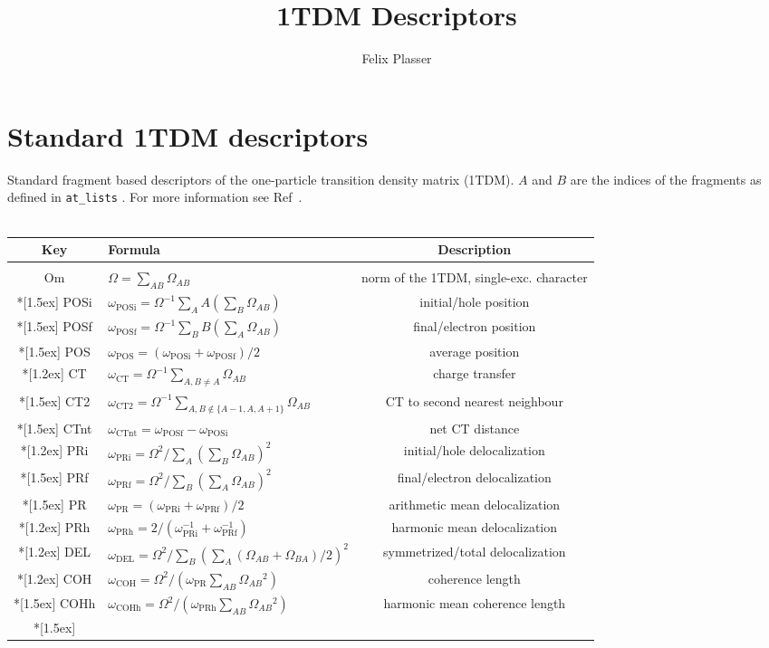 \documentclass[12pt,a4paper]{article}
\author{Felix Plasser}
\title{1TDM Descriptors}
\newcommand{\om}[1]{\omega_{\textrm{#1}}}
\begin{document}
\section{Standard 1TDM descriptors}
Standard fragment based descriptors of the one-particle transition density matrix (1TDM).
$A$ and $B$ are the indices of the fragments as defined in \texttt{at\_lists} .
For more information see Ref~\cite{DMAT}.
\\~\\
\begin{tabular}{clc}
\hline 
\textbf{Key} & \textbf{Formula} & \textbf{Description} \\ 
\hline
\\
Om & $\Omega = \sum_{AB}\Omega_{AB}$ & norm of the 1TDM, single-exc. character \\*[1.5ex]
POSi & $\om{POSi}=\Omega^{-1}\sum_A A\left(\sum_B \Omega_{AB}\right)$ & initial/hole position	 \\*[1.5ex]
POSf & $\om{POSf}=\Omega^{-1}\sum_B B\left(\sum_A \Omega_{AB}\right)$ & final/electron position	 \\*[1.5ex]
POS & $\om{POS}=(\om{POSi} + \om{POSf})/2$ & average position \\*[1.2ex]
CT  & $\om{CT}=\Omega^{-1}\sum_{A,B\neq A}\Omega_{AB}$ & charge transfer \\*[1.5ex]
CT2  & $\om{CT2}=\Omega^{-1}\sum_{A,B\not\in \lbrace A-1,A,A+1\rbrace}\Omega_{AB}$ & CT to second nearest neighbour \\*[1.5ex]
CTnt & $\om{CTnt}=\om{POSf} - \om{POSi}$ & net CT distance \\*[1.2ex]
PRi & $\om{PRi}=\Omega^{2}/\sum_A\left(\sum_B \Omega_{AB}\right)^2$ & initial/hole delocalization \\*[1.5ex]
PRf & $\om{PRf}=\Omega^{2}/\sum_B\left(\sum_A \Omega_{AB}\right)^2$ & final/electron delocalization \\*[1.5ex]
PR & $\om{PR}=(\om{PRi}+\om{PRf})/2$ & arithmetic mean delocalization\\*[1.2ex]
PRh & $\om{PRh}=2/(\om{PRi}^{-1}+\om{PRf}^{-1})$ & harmonic mean delocalization\\*[1.2ex]
DEL & $\om{DEL}=\Omega^{2}/\sum_B\left(\sum_A (\Omega_{AB}+\Omega_{BA})/2\right)^2$ & symmetrized/total delocalization\\*[1.2ex]
COH & $\om{COH}=\Omega^{2}/\left(\om{PR}\sum_{AB}\Omega_{AB}{}^2\right)$ & coherence length\\*[1.5ex]
COHh & $\om{COHh}=\Omega^{2}/\left(\om{PRh}\sum_{AB}\Omega_{AB}{}^2\right)$ & harmonic mean coherence length\\*[1.5ex]
\hline 
\end{tabular} 
\end{document}
